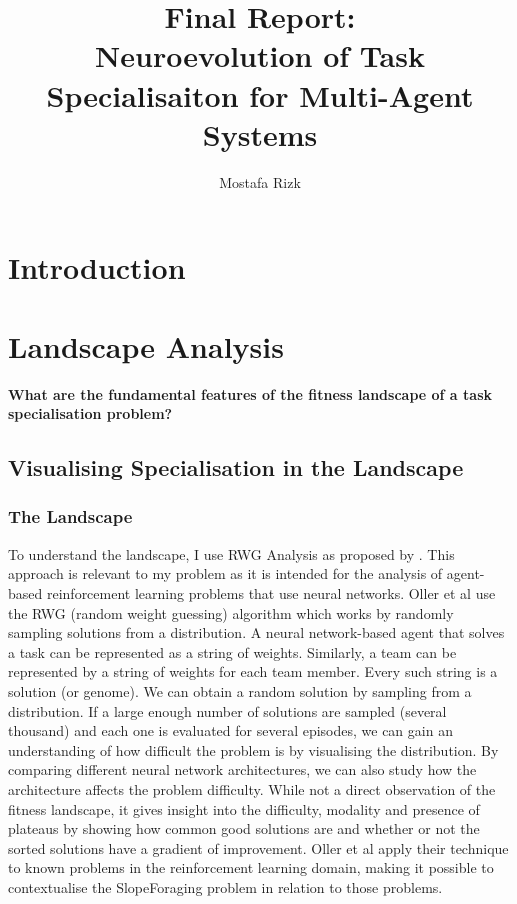 \documentclass[12pt]{article}
\title{Final Report:\\ Neuroevolution of Task Specialisaiton for Multi-Agent Systems}
\author{Mostafa Rizk}
\begin{document}
\maketitle

\section{Introduction}

\section{Landscape Analysis}

\textbf{What are the fundamental features of the fitness landscape of a task specialisation problem?}\\

\subsection{Visualising Specialisation in the Landscape}

\subsubsection{The Landscape}

To understand the landscape, I use RWG Analysis as proposed by \cite{oller:AAMAS:2020}.
This approach is relevant to my problem as it is intended for the analysis of agent-based reinforcement learning problems that use neural networks.
Oller et al use the RWG (random weight guessing) algorithm which works by randomly sampling solutions from a distribution.
A neural network-based agent that solves a task can be represented as a string of weights.
Similarly, a team can be represented by a string of weights for each team member.
Every such string is a solution (or genome).
We can obtain a random solution by sampling from a distribution.
If a large enough number of solutions are sampled (several thousand) and each one is evaluated for several episodes, we can gain an understanding of how difficult the problem is by visualising the distribution.
By comparing different neural network architectures, we can also study how the architecture affects the problem difficulty.
While not a direct observation of the fitness landscape, it gives insight into the difficulty, modality and presence of plateaus by showing how common good solutions are and whether or not the sorted solutions have a gradient of improvement.
Oller et al apply their technique to known problems in the reinforcement learning domain, making it possible to contextualise the SlopeForaging problem in relation to those problems.\\
\end{document}

